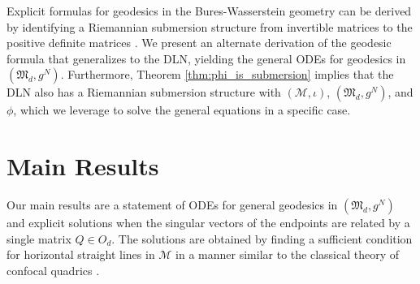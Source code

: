 \documentclass{amsart}
\theoremstyle{definition}
\theoremstyle{remark}
\numberwithin{equation}{section}
\begin{document}
Explicit formulas for geodesics in the Bures-Wasserstein geometry can be derived by identifying a Riemannian submersion structure from invertible matrices to the positive definite matrices \cite[Section 4]{bhatia2019bures}. We present an alternate derivation of the geodesic formula that generalizes to the DLN, yielding the general ODEs for geodesics in $(\mathfrak{M}_d, g^N)$. Furthermore, Theorem \ref{thm:phi_is_submersion} implies that the DLN also has a Riemannian submersion structure with $(\mathcal{M}, \iota)$, $(\mathfrak{M}_d, g^N)$, and $\phi$, which we leverage to solve the general equations in a specific case.
\section{Main Results}
Our main results are a statement of ODEs for general geodesics in $(\mathfrak{M}_d, g^N)$ and explicit solutions when the singular vectors of the endpoints are related by a single matrix $Q \in O_d$. The solutions are obtained by finding a sufficient condition for horizontal straight lines in $\mathcal{M}$ in a manner similar to the classical theory of confocal quadrics \cite{hilbert1952geometry}.
\end{document}
